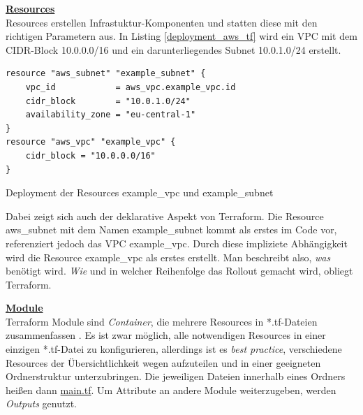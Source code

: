 \newpage
\textbf{\underline{Resources}}\\
Resources erstellen Infrastuktur-Komponenten und statten diese mit den richtigen Parametern aus. In Listing \ref{deployment_aws_tf} wird ein \gls{VPC} mit dem \gls{CIDR}-Block 10.0.0.0/16 und ein darunterliegendes Subnet 10.0.1.0/24 erstellt.
\begin{listing}[h]
\begin{verbatim}
resource "aws_subnet" "example_subnet" {
    vpc_id            = aws_vpc.example_vpc.id
    cidr_block        = "10.0.1.0/24"
    availability_zone = "eu-central-1"
}
resource "aws_vpc" "example_vpc" {
    cidr_block = "10.0.0.0/16"
}
\end{verbatim}
\caption{Deployment der Resources \glqq example\_vpc\grqq{} und \glqq example\_subnet\grqq{}}
\label{deployment_aws_tf}
\end{listing}\FloatBarrier
Dabei zeigt sich auch der deklarative Aspekt von Terraform. Die Resource \glqq aws\_subnet\grqq{} mit dem Namen \glqq example\_subnet\grqq{} kommt als erstes im Code vor, referenziert jedoch das \gls{VPC} \glqq example\_vpc\grqq{}. Durch diese impliziete Abhängigkeit wird die Resource \glqq example\_vpc\grqq{} als erstes erstellt. Man beschreibt also, \textit{was} benötigt wird. \textit{Wie} und in welcher Reihenfolge das Rollout gemacht wird, obliegt Terraform.

\textbf{\underline{Module}}\\
Terraform Module sind \textit{Container}, die mehrere Resources in *.tf-Dateien zusammenfassen \cite{tfmodule2021}. Es ist zwar möglich, alle notwendigen Resources in einer einzigen *.tf-Datei zu konfigurieren, allerdings ist es \textit{best practice}, verschiedene Resources der Übersichtlichkeit wegen aufzuteilen und in einer geeigneten Ordnerstruktur unterzubringen. Die jeweiligen Dateien innerhalb eines Ordners heißen dann \underline{main.tf}. Um Attribute an andere Module weiterzugeben, werden \textit{Outputs} genutzt. 

